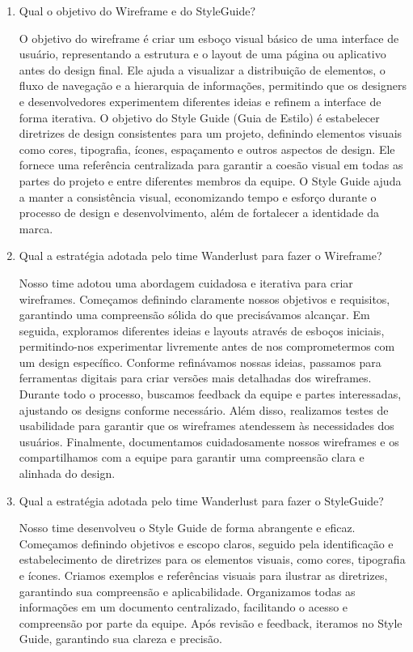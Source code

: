 \documentclass{article}
\begin{document}
\begin{enumerate}
      \item Qual o objetivo do Wireframe e do StyleGuide?

            O objetivo do wireframe é criar um esboço visual básico de uma interface de usuário, representando a estrutura e o layout de uma página ou aplicativo antes do design final. Ele ajuda a visualizar a distribuição de elementos, o fluxo de navegação e a hierarquia de informações, permitindo que os designers e desenvolvedores experimentem diferentes ideias e refinem a interface de forma iterativa.
            O objetivo do Style Guide (Guia de Estilo) é estabelecer diretrizes de design consistentes para um projeto, definindo elementos visuais como cores, tipografia, ícones, espaçamento e outros aspectos de design. Ele fornece uma referência centralizada para garantir a coesão visual em todas as partes do projeto e entre diferentes membros da equipe. O Style Guide ajuda a manter a consistência visual, economizando tempo e esforço durante o processo de design e desenvolvimento, além de fortalecer a identidade da marca.

      \item Qual a estratégia adotada pelo time Wanderlust para fazer o Wireframe?

            Nosso time adotou uma abordagem cuidadosa e iterativa para criar wireframes. Começamos definindo claramente nossos objetivos e requisitos, garantindo uma compreensão sólida do que precisávamos alcançar. Em seguida, exploramos diferentes ideias e layouts através de esboços iniciais, permitindo-nos experimentar livremente antes de nos comprometermos com um design específico. Conforme refinávamos nossas ideias, passamos para ferramentas digitais para criar versões mais detalhadas dos wireframes. Durante todo o processo, buscamos feedback da equipe e partes interessadas, ajustando os designs conforme necessário. Além disso, realizamos testes de usabilidade para garantir que os wireframes atendessem às necessidades dos usuários. Finalmente, documentamos cuidadosamente nossos wireframes e os compartilhamos com a equipe para garantir uma compreensão clara e alinhada do design.

      \item Qual a estratégia adotada pelo time Wanderlust para fazer o StyleGuide?

            Nosso time desenvolveu o Style Guide de forma abrangente e eficaz. Começamos definindo objetivos e escopo claros, seguido pela identificação e estabelecimento de diretrizes para os elementos visuais, como cores, tipografia e ícones. Criamos exemplos e referências visuais para ilustrar as diretrizes, garantindo sua compreensão e aplicabilidade. Organizamos todas as informações em um documento centralizado, facilitando o acesso e compreensão por parte da equipe. Após revisão e feedback, iteramos no Style Guide, garantindo sua clareza e precisão.


\end{enumerate}
\end{document}
